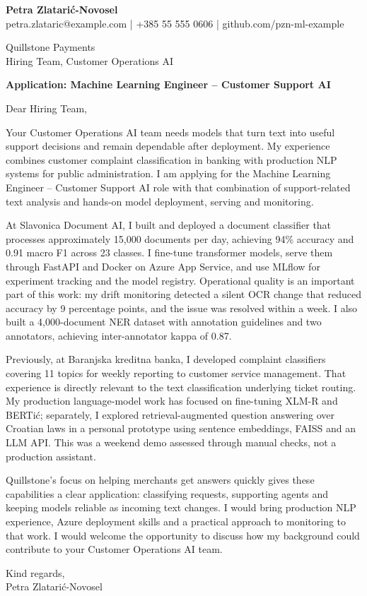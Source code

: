 \documentclass[11pt,a4paper]{article}
\begin{document}
{\large\bfseries\color{primarycolor} Petra Zlatarić-Novosel}\\
{\small petra.zlataric@example.com | +385 55 555 0606 | github.com/pzn-ml-example}

Quillstone Payments\\
Hiring Team, Customer Operations AI

\textbf{Application: Machine Learning Engineer – Customer Support AI}

Dear Hiring Team,

Your Customer Operations AI team needs models that turn text into useful support decisions and remain dependable after deployment. My experience combines customer complaint classification in banking with production NLP systems for public administration. I am applying for the Machine Learning Engineer – Customer Support AI role with that combination of support-related text analysis and hands-on model deployment, serving and monitoring.

At Slavonica Document AI, I built and deployed a document classifier that processes approximately 15,000 documents per day, achieving 94\% accuracy and 0.91 macro F1 across 23 classes. I fine-tune transformer models, serve them through FastAPI and Docker on Azure App Service, and use MLflow for experiment tracking and the model registry. Operational quality is an important part of this work: my drift monitoring detected a silent OCR change that reduced accuracy by 9 percentage points, and the issue was resolved within a week. I also built a 4,000-document NER dataset with annotation guidelines and two annotators, achieving inter-annotator kappa of 0.87.

Previously, at Baranjska kreditna banka, I developed complaint classifiers covering 11 topics for weekly reporting to customer service management. That experience is directly relevant to the text classification underlying ticket routing. My production language-model work has focused on fine-tuning XLM-R and BERTić; separately, I explored retrieval-augmented question answering over Croatian laws in a personal prototype using sentence embeddings, FAISS and an LLM API. This was a weekend demo assessed through manual checks, not a production assistant.

Quillstone's focus on helping merchants get answers quickly gives these capabilities a clear application: classifying requests, supporting agents and keeping models reliable as incoming text changes. I would bring production NLP experience, Azure deployment skills and a practical approach to monitoring to that work. I would welcome the opportunity to discuss how my background could contribute to your Customer Operations AI team.

Kind regards,\\
Petra Zlatarić-Novosel
\end{document}

